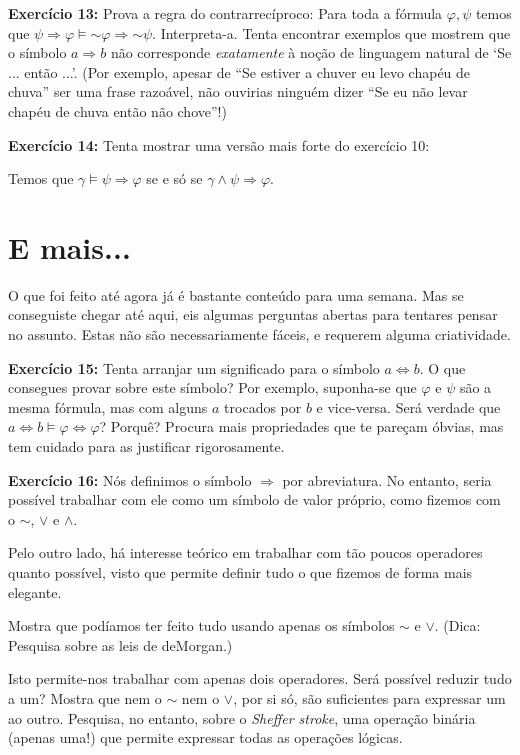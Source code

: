\documentclass{article}
\theoremstyle{definition}
\theoremstyle{remark}
\newcommand*{\lneg}{\mathord{\sim}}
\begin{document}
	\textbf{Exercício 13:} Prova a regra do contrarrecíproco: Para toda a fórmula $\varphi, \psi$ temos que $\psi \Rightarrow \varphi \vDash \lneg \varphi \Rightarrow \lneg \psi$. Interpreta-a. Tenta encontrar exemplos que mostrem que o símbolo $a \Rightarrow b$ não corresponde \emph{exatamente} à noção de linguagem natural de `Se ... então ...'. (Por exemplo, apesar de ``Se estiver a chuver eu levo chapéu de chuva'' ser uma frase razoável, não ouvirias ninguém dizer ``Se eu não levar chapéu de chuva então não chove''!)
	
	\smallskip
	
	\textbf{Exercício 14:} Tenta mostrar uma versão mais forte do exercício 10:
	
	Temos que $\gamma \vDash \psi \Rightarrow \varphi$ se e só se $\gamma \land \psi \Rightarrow \varphi$.
	
	\section{E mais...}
	
	O que foi feito até agora já é bastante conteúdo para uma semana. Mas se conseguiste chegar até aqui, eis algumas perguntas abertas para tentares pensar no assunto. Estas não são necessariamente fáceis, e requerem alguma criatividade.
	
	\textbf{Exercício 15:} Tenta arranjar um significado para o símbolo $a \Leftrightarrow b$. O que consegues provar sobre este símbolo? Por exemplo, suponha-se que $\varphi$ e $\psi$ são a mesma fórmula, mas com alguns $a$ trocados por $b$ e vice-versa. Será verdade que $a \Leftrightarrow b \vDash \varphi \Leftrightarrow \varphi$? Porquê? Procura mais propriedades que te pareçam óbvias, mas tem cuidado para as justificar rigorosamente.
	
	\textbf{Exercício 16:} Nós definimos o símbolo $\Rightarrow$ por abreviatura. No entanto, seria possível trabalhar com ele como um símbolo de valor próprio, como fizemos com o $\lneg$, $\lor$ e $\land$.
	
	Pelo outro lado, há interesse teórico em trabalhar com tão poucos operadores quanto possível, visto que permite definir tudo o que fizemos de forma mais elegante.
	
	Mostra que podíamos ter feito tudo usando apenas os símbolos $\lneg$ e $\lor$. (Dica: Pesquisa sobre as leis de deMorgan.)
	
	Isto permite-nos trabalhar com apenas dois operadores. Será possível reduzir tudo a um? Mostra que nem o $\lneg$ nem o $\lor$, por si só, são suficientes para expressar um ao outro. Pesquisa, no entanto, sobre o \emph{Sheffer stroke}, uma operação binária (apenas uma!) que permite expressar todas as operações lógicas.
	
	
\end{document}
